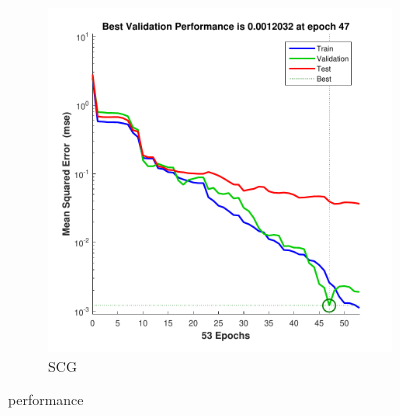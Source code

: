 \documentclass[12pt,a4paper]{article}
\begin{document}
\begin{CJK}{UTF8}{bsmi}
\begin{enumerate}
\begin{enumerate}
\begin{figure}[H]
\begin{subfigure}{.5\textwidth}
	 		\end{subfigure}%
	 		\begin{subfigure}{.5\textwidth}
	 			\centering
	 			\includegraphics[width=1\linewidth]{wine_scg_per}
	 			\caption{SCG}
	 			
	 		\end{subfigure}
	 		\caption{performance}
	 		
	 	\end{figure}
	 	

\end{enumerate}
\end{enumerate}
\end{CJK}
\end{document}
